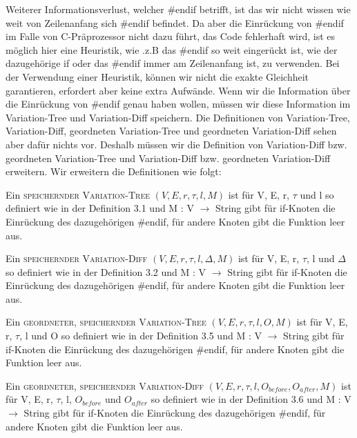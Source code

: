 Weiterer Informationsverlust, welcher \#endif betrifft, ist das wir nicht wissen wie weit von Zeilenanfang sich \#endif befindet. Da aber die Einrückung von \#endif im Falle von C-Präprozessor nicht dazu führt, das Code fehlerhaft wird, ist es möglich hier eine Heuristik, wie .z.B das \#endif so weit eingerückt ist, wie der dazugehörige if oder das \#endif immer am Zeilenanfang ist, zu verwenden. Bei der Verwendung einer Heuristik, können wir nicht die exakte Gleichheit garantieren, erfordert aber keine extra Aufwände. Wenn wir die Information über die Einrückung von \#endif genau haben wollen, müssen wir diese Information im Variation-Tree und Variation-Diff speichern. Die Definitionen von Variation-Tree, Variation-Diff, geordneten Variation-Tree und geordneten Variation-Diff sehen aber dafür nichts vor. Deshalb müssen wir die Definition von Variation-Diff bzw. geordneten Variation-Tree und Variation-Diff bzw. geordneten Variation-Diff erweitern.
Wir erweitern die Definitionen wie folgt:
\begin{definition}
	Ein \textsc{speichernder Variation-Tree} $(V,E,r,\tau,l,M) $ ist für V, E, r, $\tau$ und l so definiert wie in der Definition 3.1 und M : V $\rightarrow$ String  gibt für if-Knoten die Einrückung des dazugehörigen \#endif, für andere Knoten gibt die Funktion leer aus.
\end{definition}
\begin{definition}
	Ein \textsc{speichernder Variation-Diff} $(V,E,r,\tau,l,\Delta,M) $ ist für V, E, r, $\tau$, l und $\Delta$ so definiert wie in der Definition 3.2 und M : V $\rightarrow$ String  gibt für if-Knoten die Einrückung des dazugehörigen \#endif, für andere Knoten gibt die Funktion leer aus.
\end{definition}
\begin{definition}
	Ein \textsc{geordneter, speichernder Variation-Tree} $(V,E,r,\tau,l,O,M) $ ist für V, E, r, $\tau$, l und O so definiert wie in der Definition 3.5 und M : V $\rightarrow$ String  gibt für if-Knoten die Einrückung des dazugehörigen \#endif, für andere Knoten gibt die Funktion leer aus.
\end{definition}
\begin{definition}
	Ein \textsc{geordneter, speichernder Variation-Diff} $(V,E,r,\tau,l,O_{before},O_{after},M) $ ist für V, E, r, $\tau$, l, $O_{before}$ und $O_{after}$ so definiert wie in der Definition 3.6 und M : V $\rightarrow$ String  gibt für if-Knoten die Einrückung des dazugehörigen \#endif, für andere Knoten gibt die Funktion leer aus.
\end{definition}
